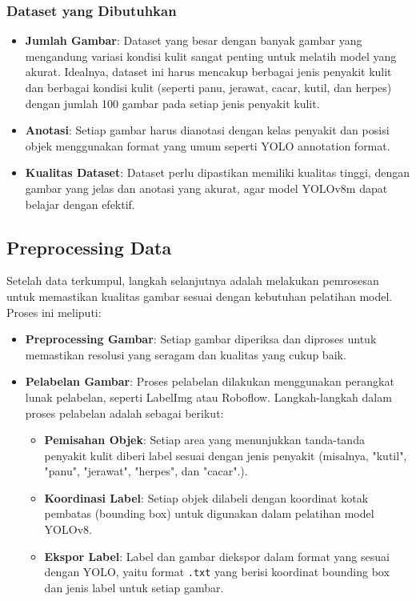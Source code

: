 \documentclass[journal,article,submit,pdftex,moreauthors]{Definitions/mdpi}
\begin{document}
\subsubsection{Dataset yang Dibutuhkan}
\begin{itemize}
    \item \textbf{Jumlah Gambar}: Dataset yang besar dengan banyak gambar yang mengandung variasi kondisi kulit sangat penting untuk melatih model yang akurat. Idealnya, dataset ini harus mencakup berbagai jenis penyakit kulit dan berbagai kondisi kulit (seperti panu, jerawat, cacar, kutil, dan herpes) dengan jumlah 100 gambar pada setiap jenis penyakit kulit.
    \item \textbf{Anotasi}: Setiap gambar harus dianotasi dengan kelas penyakit dan posisi objek menggunakan format yang umum seperti YOLO annotation format.
    \item \textbf{Kualitas Dataset}: Dataset perlu dipastikan memiliki kualitas tinggi, dengan gambar yang jelas dan anotasi yang akurat, agar model YOLOv8m dapat belajar dengan efektif.
\end{itemize}

\subsection{Preprocessing Data}

Setelah data terkumpul, langkah selanjutnya adalah melakukan pemrosesan untuk memastikan kualitas gambar sesuai dengan kebutuhan pelatihan model. Proses ini meliputi:
\begin{itemize}
    \item \textbf{Preprocessing Gambar}: Setiap gambar diperiksa dan diproses untuk memastikan resolusi yang seragam dan kualitas yang cukup baik.

    \item \textbf{Pelabelan Gambar}: Proses pelabelan dilakukan menggunakan perangkat lunak pelabelan, seperti LabelImg atau Roboflow. Langkah-langkah dalam proses pelabelan adalah sebagai berikut:
    \begin{itemize}
        \item \textbf{Pemisahan Objek}: Setiap area yang menunjukkan tanda-tanda penyakit kulit diberi label sesuai dengan jenis penyakit (misalnya, "kutil", "panu", "jerawat", "herpes", dan "cacar".).
        \item \textbf{Koordinasi Label}: Setiap objek dilabeli dengan koordinat kotak pembatas (bounding box) untuk digunakan dalam pelatihan model YOLOv8.
        \item \textbf{Ekspor Label}: Label dan gambar diekspor dalam format yang sesuai dengan YOLO, yaitu format \texttt{.txt} yang berisi koordinat bounding box dan jenis label untuk setiap gambar.
    \end{itemize}
\end{itemize}
\end{document}

